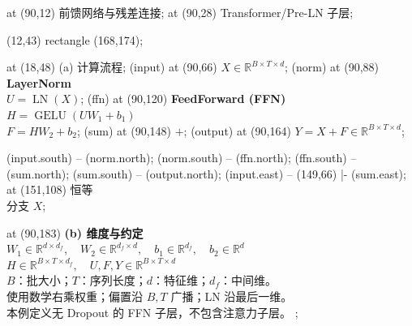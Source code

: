 \documentclass[11pt]{article}
\renewcommand{\PaperModuleFont}{\normalfont\fontsize{14}{18}\selectfont\bfseries}
\renewcommand{\PaperNoteFont}{\normalfont\fontsize{11}{15}\selectfont}
\begin{document}
\begin{papercodepage}
  \node[pagetitle,anchor=north,text width=156mm] at (90,12)
    {前馈网络与残差连接};
  \node[annotation,anchor=north,align=center] at (90,28)
    {Transformer\quad /\quad Pre-LN 子层};

  \begin{scope}
    \draw[sectionbox] (12,43) rectangle (168,174);
  \end{scope}
  \node[sectiontitle] at (18,48) {(a) 计算流程};
  \node[dimension] (input) at (90,66)
    {$X\in\mathbb{R}^{B\times T\times d}$};
  \node[basicblock,text width=58mm] (norm) at (90,88)
    {{\PaperModuleFont LayerNorm}\\[1mm]
     $U=\operatorname{LN}(X)$};
  \node[keyblock,text width=82mm] (ffn) at (90,120)
    {{\PaperModuleFont FeedForward (FFN)}\\[1.5mm]
     $H=\operatorname{GELU}(UW_1+b_1)$\\[1mm]
     $F=HW_2+b_2$};
  \node[sumblock] (sum) at (90,148) {$+$};
  \node[dimension,text width=110mm] (output) at (90,164)
    {$Y=X+F\in\mathbb{R}^{B\times T\times d}$};

  \draw[flowarrow] (input.south) -- (norm.north);
  \draw[flowarrow] (norm.south) -- (ffn.north);
  \draw[flowarrow] (ffn.south) -- (sum.north);
  \draw[flowarrow] (sum.south) -- (output.north);
  \draw[flowarrow] (input.east) -- (149,66) |- (sum.east);
  \node[annotation,anchor=west,inner sep=1mm] at (151,108) {恒等\\分支 $X$};

  \node[noteblock,anchor=north,text width=144mm] at (90,183) {
    {\PaperModuleFont (b) 维度与约定}\\[1.5mm]
    $W_1\in\mathbb{R}^{d\times d_f},\quad
     W_2\in\mathbb{R}^{d_f\times d},\quad
     b_1\in\mathbb{R}^{d_f},\quad b_2\in\mathbb{R}^{d}$\\[1mm]
    $H\in\mathbb{R}^{B\times T\times d_f},\quad
     U,F,Y\in\mathbb{R}^{B\times T\times d}$\\[1mm]
    {\PaperNoteFont $B$：批大小；$T$：序列长度；$d$：特征维；$d_f$：中间维。\\
    使用数学右乘权重；偏置沿 $B,T$ 广播；LN 沿最后一维。\\
    本例定义无 Dropout 的 FFN 子层，不包含注意力子层。}
  };
\end{papercodepage}
\end{document}
